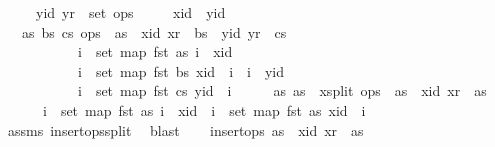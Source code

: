 \begin{isabellebody}
\ \ \ \ \ {\isachardoublequoteopen}{\isacharparenleft}yid{\isacharcomma}\ yr{\isacharparenright}\ {\isasymin}\ set\ ops{\isachardoublequoteclose}\isanewline
\ \ \ \ \ {\isachardoublequoteopen}xid\ {\isacharless}\ yid{\isachardoublequoteclose}\isanewline
\ \ \ {\isachardoublequoteopen}{\isasymexists}as\ bs\ cs{\isachardot}\ ops\ {\isacharequal}\ as\ {\isacharat}\ {\isacharbrackleft}{\isacharparenleft}xid{\isacharcomma}\ xr{\isacharparenright}{\isacharbrackright}\ {\isacharat}\ bs\ {\isacharat}\ {\isacharbrackleft}{\isacharparenleft}yid{\isacharcomma}\ yr{\isacharparenright}{\isacharbrackright}\ {\isacharat}\ cs\ {\isasymand}\isanewline
\ \ \ \ \ \ \ \ \ \ \ {\isacharparenleft}{\isasymforall}i\ {\isasymin}\ set\ {\isacharparenleft}map\ fst\ as{\isacharparenright}{\isachardot}\ i\ {\isacharless}\ xid{\isacharparenright}\ {\isasymand}\isanewline
\ \ \ \ \ \ \ \ \ \ \ {\isacharparenleft}{\isasymforall}i\ {\isasymin}\ set\ {\isacharparenleft}map\ fst\ bs{\isacharparenright}{\isachardot}\ xid\ {\isacharless}\ i\ {\isasymand}\ i\ {\isacharless}\ yid{\isacharparenright}\ {\isasymand}\isanewline
\ \ \ \ \ \ \ \ \ \ \ {\isacharparenleft}{\isasymforall}i\ {\isasymin}\ set\ {\isacharparenleft}map\ fst\ cs{\isacharparenright}{\isachardot}\ yid\ {\isacharless}\ i{\isacharparenright}{\isachardoublequoteclose}\isanewline
%
\isadelimproof
%
\endisadelimproof
%
\isatagproof
{}\isamarkupfalse%
\ {\isacharminus}\isanewline
\ \ \isamarkupfalse%
\ as\ as{}\ \ x{\isacharunderscore}split{\isacharcolon}\ {\isachardoublequoteopen}ops\ {\isacharequal}\ as\ {\isacharat}\ {\isacharbrackleft}{\isacharparenleft}xid{\isacharcomma}\ xr{\isacharparenright}{\isacharbrackright}\ {\isacharat}\ as{}\ {\isasymand}\isanewline
\ \ \ \ \ \ {\isacharparenleft}{\isasymforall}i\ {\isasymin}\ set\ {\isacharparenleft}map\ fst\ as{\isacharparenright}{\isachardot}\ i\ {\isacharless}\ xid{\isacharparenright}\ {\isasymand}\ {\isacharparenleft}{\isasymforall}i\ {\isasymin}\ set\ {\isacharparenleft}map\ fst\ as{}{\isacharparenright}{\isachardot}\ xid\ {\isacharless}\ i{\isacharparenright}{\isachardoublequoteclose}\isanewline
\ \ \ \ \isamarkupfalse%
\ assms\ insert{\isacharunderscore}ops{\isacharunderscore}split\ \isamarkupfalse%
\ blast\isanewline
\ \ \isamarkupfalse%
\ {\isachardoublequoteopen}insert{\isacharunderscore}ops\ {\isacharparenleft}{\isacharparenleft}as\ {\isacharat}\ {\isacharbrackleft}{\isacharparenleft}xid{\isacharcomma}\ xr{\isacharparenright}{\isacharbrackright}{\isacharparenright}\ {\isacharat}\ as{}{\isacharparenright}{\isachardoublequoteclose}\isanewline

\end{isabellebody}
